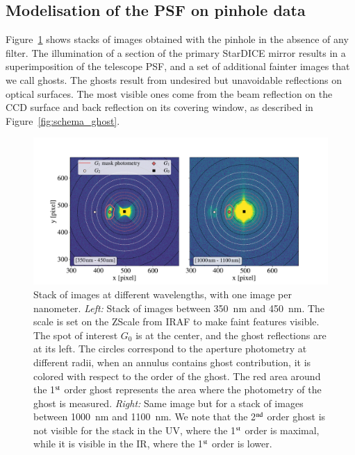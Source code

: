 \subsection{Modelisation of the \SD PSF on \spinhole pinhole data}
\label{sec:modelisation-sd-psf}

Figure~\ref{fig:ghost_contrast} shows stacks of images obtained with the \spinhole pinhole in the absence of any filter. The illumination of a section of the primary StarDICE mirror results in a superimposition of the \SD telescope PSF, and a set of additional fainter images that we call ghosts. The ghosts result from undesired but unavoidable reflections on optical surfaces. The most visible ones come from the beam reflection on the CCD surface and back reflection on its covering window, as described in Figure~\ref{fig:schema_ghost}.\\

\begin{figure}[h]
    \centering
    \includegraphics[width=\columnwidth]{fig/ghost_contrast.pdf}
    \caption{Stack of images at different wavelengths, with one image per nanometer. \textit{Left:} Stack of images between \SI{350}{\nano\meter} and \SI{450}{\nano\meter}. The scale is set on the ZScale from IRAF to make faint features visible. The spot of interest $G_0$ is at the center, and the ghost reflections are at its left. The circles correspond to the aperture photometry at different radii, when an annulus contains ghost contribution, it is colored with respect to the order of the ghost. The red area around the 1$\textsuperscript{st}$ order ghost represents the area where the photometry of the ghost is measured. \textit{Right:} Same image but for a stack of images between \SI{1000}{\nano\meter} and \SI{1100}{\nano\meter}. We note that the 2$\textsuperscript{nd}$ order ghost is not visible for the stack in the UV, where the 1$\textsuperscript{st}$ order is maximal, while it is visible in the IR, where the 1$\textsuperscript{st}$ order is lower.}
    \label{fig:ghost_contrast}
\end{figure}

